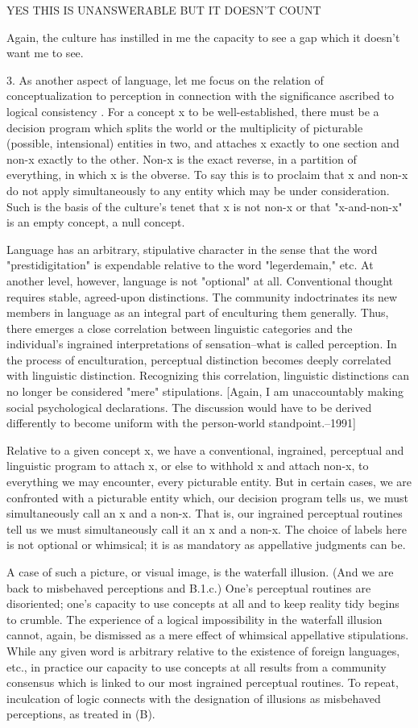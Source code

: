     YES THIS IS UNANSWERABLE BUT IT DOESN'T COUNT

Again, the culture has instilled in me the capacity to see a gap which it doesn't want me to see.

3. As another aspect of language, let me focus on the relation of conceptualization to perception in connection with the significance ascribed to logical consistency . For a concept x to be well-established, there must be a decision program which splits the world or the multiplicity of picturable (possible, intensional) entities in two, and attaches x exactly to one section and non-x exactly to the other. Non-x is the exact reverse, in a partition of everything, in which x is the obverse. To say this is to proclaim that x and non-x do not apply simultaneously to any entity which may be under consideration. Such is the basis of the culture's tenet that x is not non-x or that "x-and-non-x" is an empty concept, a null concept.

Language has an arbitrary, stipulative character in the sense that the word "prestidigitation" is expendable relative to the word "legerdemain," etc. At another level, however, language is not "optional" at all. Conventional thought requires stable, agreed-upon distinctions. The community indoctrinates its new members in language as an integral part of enculturing them generally. Thus, there emerges a close correlation between linguistic categories and the individual's ingrained interpretations of sensation--what is called perception. In the process of enculturation, perceptual distinction becomes deeply correlated with linguistic distinction. Recognizing this correlation, linguistic distinctions can no longer be considered "mere" stipulations. [Again, I am unaccountably making social psychological declarations. The discussion would have to be derived differently to become uniform with the person-world standpoint.--1991]

Relative to a given concept x, we have a conventional, ingrained, perceptual and linguistic program to attach x, or else to withhold x and attach non-x, to everything we may encounter, every picturable entity. But in certain cases, we are confronted with a picturable entity which, our decision program tells us, we must simultaneously call an x and a non-x. That is, our ingrained perceptual routines tell us we must simultaneously call it an x and a non-x. The choice of labels here is not optional or whimsical; it is as mandatory as appellative judgments can be.

A case of such a picture, or visual image, is the waterfall illusion. (And we are back to misbehaved perceptions and B.1.c.) One's perceptual routines are disoriented; one's capacity to use concepts at all and to keep reality tidy begins to crumble. The experience of a logical impossibility in the waterfall illusion cannot, again, be dismissed as a mere effect of whimsical appellative stipulations. While any given word is arbitrary relative to the existence of foreign languages, etc., in practice our capacity to use concepts at all results from a community consensus which is linked to our most ingrained perceptual routines. To repeat, inculcation of logic connects with the designation of illusions as misbehaved perceptions, as treated in (B).


